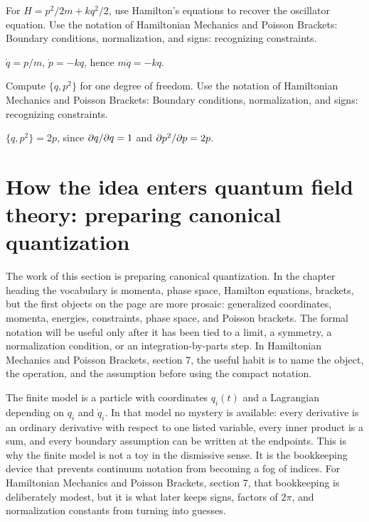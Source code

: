 \begin{exercise}
For \(H=p^2/2m+kq^2/2\), use Hamilton's equations to recover the oscillator equation.  Use the notation of Hamiltonian Mechanics and Poisson Brackets: Boundary conditions, normalization, and signs: recognizing constraints.
\begin{answer}
\(\dot q=p/m\), \(\dot p=-kq\), hence \(m\ddot q=-kq\).
\end{answer}
\end{exercise}

\begin{exercise}
Compute \(\{q,p^2\}\) for one degree of freedom.  Use the notation of Hamiltonian Mechanics and Poisson Brackets: Boundary conditions, normalization, and signs: recognizing constraints.
\begin{answer}
\(\{q,p^2\}=2p\), since \(\partial q/\partial q=1\) and \(\partial p^2/\partial p=2p\).
\end{answer}
\end{exercise}



\section{How the idea enters quantum field theory: preparing canonical quantization}

The work of this section is preparing canonical quantization.  In the chapter heading the vocabulary is momenta, phase space, Hamilton equations, brackets, but the first objects on the page are more prosaic: generalized coordinates, momenta, energies, constraints, phase space, and Poisson brackets.  The formal notation will be useful only after it has been tied to a limit, a symmetry, a normalization condition, or an integration-by-parts step.  In Hamiltonian Mechanics and Poisson Brackets, section 7, the useful habit is to name the object, the operation, and the assumption before using the compact notation.

The finite model is a particle with coordinates \(q_i(t)\) and a Lagrangian depending on \(q_i\) and \(\dot q_i\).  In that model no mystery is available: every derivative is an ordinary derivative with respect to one listed variable, every inner product is a sum, and every boundary assumption can be written at the endpoints.  This is why the finite model is not a toy in the dismissive sense.  It is the bookkeeping device that prevents continuum notation from becoming a fog of indices.  For Hamiltonian Mechanics and Poisson Brackets, section 7, that bookkeeping is deliberately modest, but it is what later keeps signs, factors of \(2\pi\), and normalization constants from turning into guesses.

